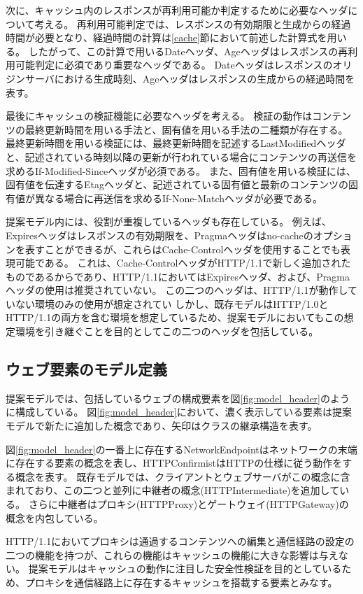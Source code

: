 \documentclass{css}
\begin{document}
次に、キャッシュ内のレスポンスが再利用可能か判定するために必要なヘッダについて考える。
再利用可能判定では、レスポンスの有効期限と生成からの経過時間が必要となり、経過時間の計算は\ref{cache}節において前述した計算式を用いる。
したがって、この計算で用いるDateヘッダ、Ageヘッダはレスポンスの再利用可能判定に必須であり重要なヘッダである。
Dateヘッダはレスポンスのオリジンサーバにおける生成時刻、Ageヘッダはレスポンスの生成からの経過時間を表す。

最後にキャッシュの検証機能に必要なヘッダを考える。
検証の動作はコンテンツの最終更新時間を用いる手法と、固有値を用いる手法の二種類が存在する。
最終更新時間を用いる検証には、最終更新時間を記述するLastModifiedヘッダと、記述されている時刻以降の更新が行われている場合にコンテンツの再送信を求めるIf-Modified-Sinceヘッダが必須である。
また、固有値を用いる検証には、固有値を伝達するEtagヘッダと、記述されている固有値と最新のコンテンツの固有値が異なる場合に再送信を求めるIf-None-Matchヘッダが必要である。

提案モデル内には、役割が重複しているヘッダも存在している。
例えば、Expiresヘッダはレスポンスの有効期限を、Pragmaヘッダはno-cacheのオプションを表すことができるが、これらはCache-Controlヘッダを使用することでも表現可能である。
これは、Cache-ControlヘッダがHTTP/1.1で新しく追加されたものであるからであり、HTTP/1.1においてはExpiresヘッダ、および、Pragmaヘッダの使用は推奨されていない。
この二つのヘッダは、HTTP/1.1が動作していない環境のみの使用が想定されてい
しかし、既存モデルはHTTP/1.0とHTTP/1.1の両方を含む環境を想定しているため、提案モデルにおいてもこの想定環境を引き継ぐことを目的としてこの二つのヘッダを包括している。

\subsection{ウェブ要素のモデル定義}
提案モデルでは、包括しているウェブの構成要素を図\ref{fig:model_header}のように構成している。
図\ref{fig:model_header}において、濃く表示している要素は提案モデルで新たに追加した概念であり、矢印はクラスの継承構造を表す。

図\ref{fig:model_header}の一番上に存在するNetworkEndpointはネットワークの末端に存在する要素の概念を表し、HTTPConfirmistはHTTPの仕様に従う動作をする概念を表す。
既存モデルでは、クライアントとウェブサーバがこの概念に含まれており、この二つと並列に中継者の概念(HTTPIntermediate)を追加している。
さらに中継者はプロキシ(HTTPProxy)とゲートウェイ(HTTPGateway)の概念を内包している。

HTTP/1.1においてプロキシは通過するコンテンツへの編集と通信経路の設定の二つの機能を持つが、これらの機能はキャッシュの機能に大きな影響は与えない。
提案モデルはキャッシュの動作に注目した安全性検証を目的としているため、プロキシを通信経路上に存在するキャッシュを搭載する要素とみなす。
\end{document}

